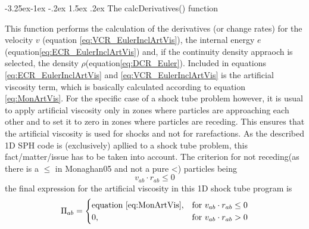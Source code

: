 \documentclass{report}
\makeatletter
\renewcommand\paragraph{\@startsection{paragraph}{4}{\z@}%
  {-3.25ex\@plus -1ex \@minus -.2ex}%
  {1.5ex \@plus .2ex}%
  {\normalfont\normalsize\bfseries}}
\makeatother
\begin{document}
\paragraph{The calcDerivatives() function}

This function performs the calculation of the derivatives (or change rates) for the velocity $v$ (equation \ref{eq:VCR_EulerInclArtVis}), the internal energy $e$ (equation\ref{eq:ECR_EulerInclArtVis}) and, if the continuity density appraoch is selected, the density $\rho$(equation\ref{eq:DCR_Euler}). Included in equations \ref{eq:ECR_EulerInclArtVis} and \ref{eq:VCR_EulerInclArtVis} is the artificial viscosity term, which is basically calculated according to equation \ref{eq:MonArtVis}. For the specific case of a shock tube problem however, it is usual to apply artificial viscosity only in zones where particles are approaching each other and to set it to zero in zones where particles are receding. This ensures that the artificial viscosity is used for shocks and not for rarefactions\cite{Monaghan2005}. As the described 1D SPH code is (exclusively) apllied to a shock tube problem, this fact/matter/issue has to be taken into account. 
The criterion for not receding(as there is a $\leq$ in Monaghan05 and not a pure <) particles being 
\begin{equation}
 v_{ab}\cdot r_{ab}\leq 0
\end{equation}
the final expression for the artificial viscosity in this 1D shock tube program is
\begin{equation}
\Pi_{ab}=\begin{cases}
\text{equation \ref{eq:MonArtVis}}, &  \text{for~} v_{ab}\cdot r_{ab}\leq 0 \\
0,&  \text{for~} v_{ab}\cdot r_{ab}> 0 
\end{cases}
\end{equation}
\end{document}
